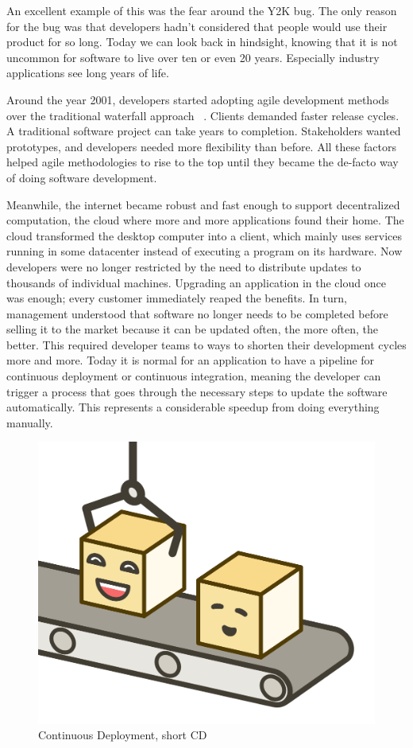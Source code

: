 An excellent example of this was the fear around the Y2K bug. The only reason for the bug was that developers hadn't considered that people would use their product for so long. Today we can look back in hindsight, knowing that it is not uncommon for software to live over ten or even 20 years. Especially industry applications see long years of life.

Around the year 2001, developers started adopting agile development methods over the traditional waterfall approach ~\cite{agile.2020}. Clients demanded faster release cycles. A traditional software project can take years to completion. Stakeholders wanted prototypes, and developers needed more flexibility than before. All these factors helped agile methodologies to rise to the top until they became the de-facto way of doing software development.

Meanwhile, the internet became robust and fast enough to support decentralized computation, the cloud where more and more applications found their home. The cloud transformed the desktop computer into a client, which mainly uses services running in some datacenter instead of executing a program on its hardware. Now developers were no longer restricted by the need to distribute updates to thousands of individual machines. Upgrading an application in the cloud once was enough; every customer immediately reaped the benefits. In turn, management understood that software no longer needs to be completed before selling it to the market because it can be updated often, the more often, the better. This required developer teams to ways to shorten their development cycles more and more. Today it is normal for an application to have a pipeline for continuous deployment or continuous integration, meaning the developer can trigger a process that goes through the necessary steps to update the software automatically. This represents a considerable speedup from doing everything manually.

\begin{figure}[ht]
  \centering
  \includegraphics[width=0.3\linewidth]{assets/illustration-microservice-cd.png}
  \caption{Continuous Deployment, short CD}
\end{figure}

